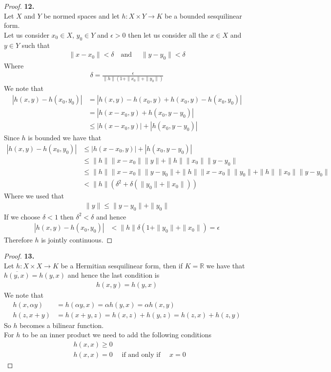 \documentclass[11pt]{article}
\newcommand{\R}{\mathbb{R}}
\theoremstyle{definition}
\begin{document}
\cleardoublepage
\begin{proof}{\textbf{12.}}\\
Let $X$ and $Y$ be normed spaces and let $h:X \times Y \to K$ be a bounded
sesquilinear form. \\
Let us consider $x_0 \in X$, $y_0 \in Y$ and $\epsilon > 0$ then let us
consider all the $x \in X$ and $y \in Y$ such that
\begin{align*}
    \|x - x_0\| < \delta
    \quad \text{and } \quad
    \|y - y_0\| < \delta
\end{align*}
Where
\begin{align*}
    \delta = \frac{\epsilon}{\|h\|(1 + \|x_0\| + \|y_0\|)}
\end{align*}
We note that
\begin{align*}
    |h(x,y) - h(x_0, y_0)| &= |h(x,y) - h(x_0,y) + h(x_0,y) - h(x_0, y_0)|\\
    &= |h(x -x_0,y) + h(x_0,y- y_0)|\\
    &\leq |h(x -x_0,y)| + |h(x_0,y- y_0)|
\end{align*}
Since $h$ is bounded we have that
\begin{align*}
    |h(x,y) - h(x_0, y_0)|
    &\leq |h(x -x_0,y)| + |h(x_0,y- y_0)| \\
    &\leq \|h\|\|x -x_0\|\|y\| + \|h\|\|x_0\|\|y -y_0\| \\
    &\leq \|h\|\|x -x_0\|\|y -y_0\|
    + \|h\|\|x -x_0\|\|y_0\|
    + \|h\|\|x_0\|\|y -y_0\| \\
    &< \|h\|(\delta^2 + \delta(\|y_0\| + \|x_0\|))
\end{align*}
Where we used that
\begin{align*}
    \|y\| \leq \|y -y_0\| + \|y_0\|
\end{align*}
If we choose $\delta < 1$ then $\delta^2 < \delta$ and hence
\begin{align*}
    |h(x,y) - h(x_0, y_0)|
    &< \|h\|\delta(1 + \|y_0\| + \|x_0\|)
    = \epsilon
\end{align*}
Therefore $h$ is jointly continuous.
\end{proof}

\cleardoublepage
\begin{proof}{\textbf{13.}}\\
Let $h:X\times X \to K$ be a Hermitian sesquilinear form, then if $K = \R$ we
have that $\overline{h(y, x)} = h(y,x)$ and hence the last condition is
\begin{align*}
    h(x, y) = h(y, x)
\end{align*}
We note that
\begin{align*}
    h(x, \alpha y) &= h(\alpha y, x) = \alpha h(y, x) = \alpha h(x, y) \\
    h(z, x + y) &= h(x + y, z) = h(x, z) + h(y, z) = h(z, x) + h(z, y)
\end{align*}
So $h$ becomes a bilinear function. \\
For $h$ to be an inner product we need to add the following conditions
\begin{align*}
    &h(x,x) \geq 0 \\
    &h(x,x) = 0 \quad\text{ if and only if }\quad x = 0
\end{align*}
\end{proof}
\end{document}
